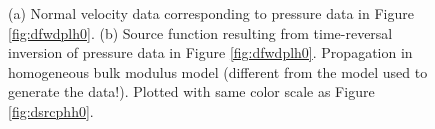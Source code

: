 \documentclass[12pt]{geophysics}
\begin{document}
\begin{figure}
  \centering
  \caption{(a) Normal velocity data corresponding to pressure data in
    Figure \ref{fig:dfwdplh0}. (b) Source function resulting from time-reversal inversion
    of pressure data in Figure \ref{fig:dfwdplh0}. Propagation in homogeneous
    bulk modulus model (different from the model used to generate the
    data!). Plotted with same color scale as Figure \ref{fig:dsrcphh0}.}
\end{figure}
\end{document}

